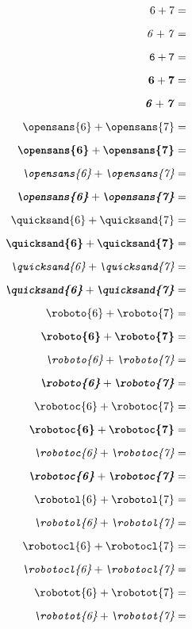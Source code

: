 \documentclass[a4paper,12pt]{article}
\begin{document}
\begin{multicols}{5}
\begin{align*}
\end{align*}
\begin{align*}
\mathrm{6}+\mathrm{7}&=\\[0.6em]
\mathit{6}+\mathit{7}&=\\[0.6em]
\mathtt{6}+\mathtt{7}&=\\[0.6em]
\mathbf{6}+\mathbf{7}&=\\[0.6em]
\textbf{\textit{6}}+\textbf{\textit{7}}&=\\[0.6em]
\textrm{\opensans{6}}+\textrm{\opensans{7}}&=\\[0.6em]
\textbf{\opensans{6}}+\textbf{\opensans{7}}&=\\[0.6em]
\textit{\opensans{6}}+\textit{\opensans{7}}&=\\[0.6em]
\textbf{\textit{\opensans{6}}}+\textbf{\textit{\opensans{7}}}&=\\[0.6em]
\textrm{\quicksand{6}}+\textrm{\quicksand{7}}&=\\[0.6em]
\textbf{\quicksand{6}}+\textbf{\quicksand{7}}&=\\[0.6em]
\textit{\quicksand{6}}+\textit{\quicksand{7}}&=\\[0.6em]
\textbf{\textit{\quicksand{6}}}+\textbf{\textit{\quicksand{7}}}&=\\[0.6em]
\textrm{\roboto{6}}+\textrm{\roboto{7}}&=\\[0.6em]
\textbf{\roboto{6}}+\textbf{\roboto{7}}&=\\[0.6em]
\textit{\roboto{6}}+\textit{\roboto{7}}&=\\[0.6em]
\textbf{\textit{\roboto{6}}}+\textbf{\textit{\roboto{7}}}&=\\[0.6em]
\textrm{\robotoc{6}}+\textrm{\robotoc{7}}&=\\[0.6em]
\textbf{\robotoc{6}}+\textbf{\robotoc{7}}&=\\[0.6em]
\textit{\robotoc{6}}+\textit{\robotoc{7}}&=\\[0.6em]
\textbf{\textit{\robotoc{6}}}+\textbf{\textit{\robotoc{7}}}&=\\[0.6em]
\textrm{\robotol{6}}+\textrm{\robotol{7}}&=\\[0.6em]
\textit{\robotol{6}}+\textit{\robotol{7}}&=\\[0.6em]
\textrm{\robotocl{6}}+\textrm{\robotocl{7}}&=\\[0.6em]
\textit{\robotocl{6}}+\textit{\robotocl{7}}&=\\[0.6em]
\textrm{\robotot{6}}+\textrm{\robotot{7}}&=\\[0.6em]
\textit{\robotot{6}}+\textit{\robotot{7}}&=\\[0.6em]

\end{align*}
\end{multicols}
\end{document}
